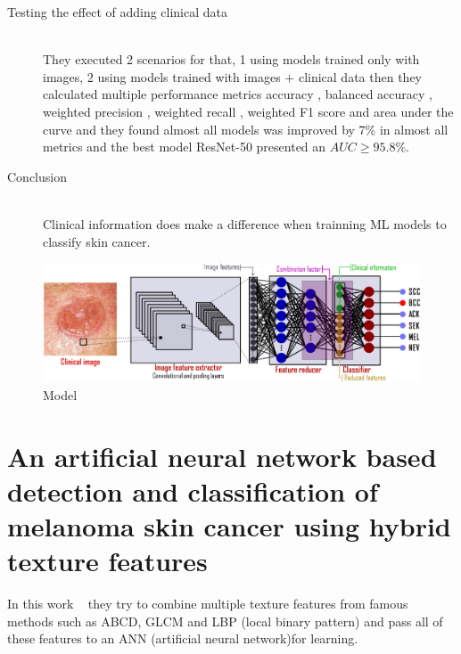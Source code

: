 \begin{description}
\item[Testing the effect of adding clinical data] \hfill \\
    They executed 2 scenarios for that, 1 using models trained only with images, 2 using models trained with images + clinical data then they calculated multiple  performance metrics accuracy , balanced accuracy , weighted precision , weighted recall , weighted F1 score  and area under the curve and they found almost all models was improved by 7\% in almost all metrics and the best model ResNet-50 presented an $AUC \geq 95.8\%$.

\item[Conclusion] \hfill \\
    Clinical information does make a difference when trainning ML models to classify skin cancer.
\end{description}



\begin{figure}[htbp]
\begin{center}
\includegraphics[width=15cm]{./chapter-03-state-of-the-art/clinical-image.png}
\end{center}
\caption{Model}
\label{fig:model}
\end{figure}






\section{An artificial neural network based detection and classification of melanoma skin cancer using hybrid texture features}

    In this work ~\cite{Tumpa2021} they try to combine multiple texture features from famous methods such as  ABCD, GLCM and LBP (local binary pattern) and pass all of these features to an ANN (artificial neural network)for learning.

